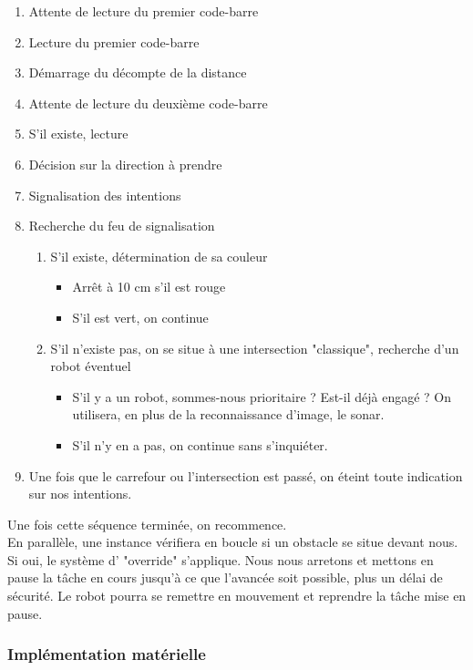 		\begin{enumerate}
			\item Attente de lecture du premier code-barre
			\item Lecture du premier code-barre
			\item Démarrage du décompte de la distance
			\item Attente de lecture du deuxième code-barre
			\item S'il existe, lecture
			\item Décision sur la direction à prendre
			\item Signalisation des intentions
			\item Recherche du feu de signalisation
			\begin{enumerate}
				\item S'il existe, détermination de sa couleur
				\begin{itemize}
					\item Arrêt à 10 cm s'il est rouge
					\item S'il est vert, on continue
				\end{itemize}
				\item S'il n'existe pas, on se situe à une intersection "classique", recherche d'un robot éventuel
				\begin{itemize}
					\item S'il y a un robot, sommes-nous prioritaire ? Est-il déjà engagé ? On utilisera, en plus de la reconnaissance d'image, le sonar.
					\item S'il n'y en a pas, on continue sans s'inquiéter.
				\end{itemize}
			\end{enumerate}
			\item Une fois que le carrefour ou l'intersection est passé, on éteint toute indication sur nos intentions.
		\end{enumerate}
		Une fois cette séquence terminée, on recommence.
		\\
		En parallèle, une instance vérifiera en boucle si un obstacle se situe devant nous. Si oui, le système d' "override" s'applique. Nous nous arretons et mettons en pause la tâche en cours jusqu'à ce que l'avancée soit possible, plus un délai de sécurité. Le robot pourra se remettre en mouvement et reprendre la tâche mise en pause.


	\subsubsection{Implémentation matérielle}

